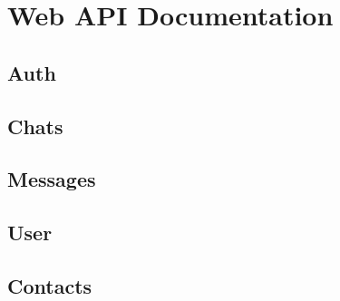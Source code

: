 \chapter{Web API Documentation}\label{ch:web-api-documentation}


\section{Auth}\label{sec:auth}



\section{Chats}\label{sec:chats}



\section{Messages}\label{sec:messages}



\section{User}\label{sec:user}



\section{Contacts}\label{sec:contacts}



